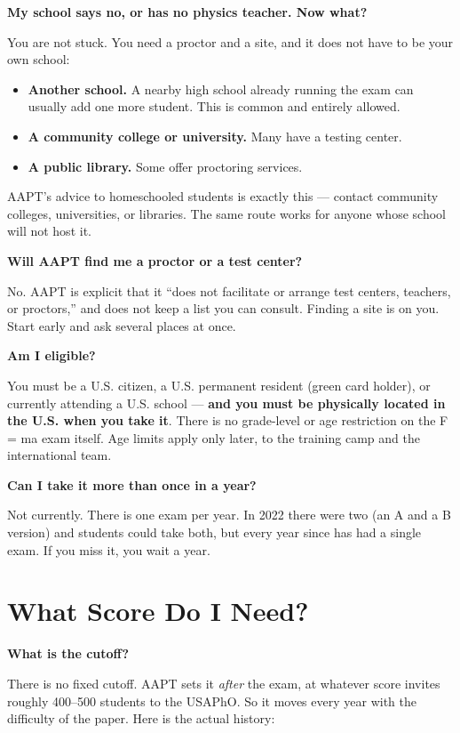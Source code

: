 \documentclass[11pt]{article}
\newcommand{\Q}[1]{\par\medskip\noindent\textbf{\color{qblue}#1}\par\nobreak\vspace{1pt}\nobreak}
\begin{document}
\Q{My school says no, or has no physics teacher. Now what?}
You are not stuck. You need a proctor and a site, and it does not have to be your own
school:

\begin{itemize}\setlength{\itemsep}{1pt}
\item \textbf{Another school.} A nearby high school already running the exam can usually
add one more student. This is common and entirely allowed.
\item \textbf{A community college or university.} Many have a testing center.
\item \textbf{A public library.} Some offer proctoring services.
\end{itemize}

AAPT's advice to homeschooled students is exactly this --- contact community colleges,
universities, or libraries. The same route works for anyone whose school will not host it.

\Q{Will AAPT find me a proctor or a test center?}
No. AAPT is explicit that it ``does not facilitate or arrange test centers, teachers, or
proctors,'' and does not keep a list you can consult. Finding a site is on you. Start early
and ask several places at once.

\Q{Am I eligible?}
You must be a U.S. citizen, a U.S. permanent resident (green card holder), or currently
attending a U.S. school --- \textbf{and you must be physically located in the U.S. when you
take it}. There is no grade-level or age restriction on the F = ma exam itself. Age limits
apply only later, to the training camp and the international team.

\Q{Can I take it more than once in a year?}
Not currently. There is one exam per year. In 2022 there were two (an A and a B version)
and students could take both, but every year since has had a single exam. If you miss it,
you wait a year.

\section{What Score Do I Need?}

\Q{What is the cutoff?}
There is no fixed cutoff. AAPT sets it \emph{after} the exam, at whatever score invites
roughly 400--500 students to the USAPhO. So it moves every year with the difficulty of the
paper. Here is the actual history:
\end{document}
